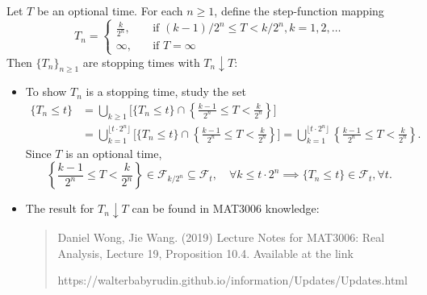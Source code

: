 \begin{example}\label{Exp:5:1}
Let $T$ be an optional time. For each $n\ge1$, define the step-function mapping
\[
T_n = \left\{
\begin{aligned}
\frac{k}{2^n},&\quad\text{if $(k-1)/2^n\le T<k/2^n, k=1,2,\ldots$}\\
\infty,&\quad\text{if $T=\infty$}
\end{aligned}
\right.
\]
Then $\{T_n\}_{n\ge1}$ are stopping times with $T_n\downarrow T$:
\begin{itemize}
\item
To show $T_n$ is a stopping time, study the set
\begin{align*}
\{T_n\le t\}&=\bigcup_{k\ge1}\bigg[
\{T_n\le t\}\cap\left\{
\frac{k-1}{2^n}\le T<\frac{k}{2^n}
\right\}
\bigg]\\&=\bigcup_{k=1}^{\lfloor t\cdot 2^n\rfloor}\bigg[
\{T_n\le t\}\cap\left\{
\frac{k-1}{2^n}\le T<\frac{k}{2^n}
\right\}
\bigg]=\bigcup_{k=1}^{\lfloor t\cdot 2^n\rfloor}\left\{
\frac{k-1}{2^n}\le T<\frac{k}{2^n}
\right\}.
\end{align*}
Since $T$ is an optional time,
\[
\left\{
\frac{k-1}{2^n}\le T<\frac{k}{2^n}
\right\}\in\mathcal{F}_{k/2^n}\subseteq\mathcal{F}_t,\quad\forall k\le t\cdot 2^n
\implies
\{T_n\le t\}\in\mathcal{F}_t,\forall t.
\]
\item
The result for $T_n\downarrow T$ can be found in MAT3006 knowledge:
\begin{quotation}
Daniel Wong, Jie Wang. (2019) Lecture Notes
for MAT3006: Real Analysis, Lecture 19, Proposition 10.4. Available at
the link 

https://walterbabyrudin.github.io/information/Updates/Updates.html
\end{quotation}
\end{itemize}
\end{example}


